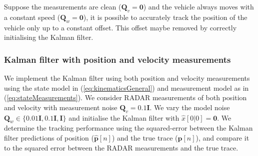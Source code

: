 \documentclass[11pt]{article}
\newcommand{\bI}{\mathbf{I}}
\newcommand{\bQ}{\mathbf{Q}}
\newcommand{\zerovec}{\boldsymbol{0}}
\begin{document}
Suppose the measurements are clean ($\bQ_{v}=\zerovec$) and the vehicle always moves with a constant speed ($\bQ_{w}=\zerovec$), it is possible to accurately track the position of the vehicle only up to a constant offset. This offset maybe removed by correctly initialising the Kalman filter.


\subsubsection{Kalman filter with position and velocity measurements}
\label{subsubsec:kalmanPostionVelocity}

We implement the Kalman filter using both position and velocity measurements using the state model in (\ref{eq:kinematicsGeneral}) and measurement model as in (\ref{eq:stateMeasurements}). We consider RADAR measurements of both position and velocity with measurement noise $\bQ_{v}=0.1\bI$. We vary the model noise $\bQ_{w}\in\{0.01\bI,0.1\bI,\bI\}$ and initialise the Kalman filter with $\hat{x}[0|0] = \zerovec$. We determine the tracking performance using the squared-error between the Kalman filter predictions of position ($\hat{\mathbf{p}}[n]$) and the true trace ($\mathbf{p}[n]$), and compare it to the squared error between the RADAR measurements and the true trace.
\end{document}
